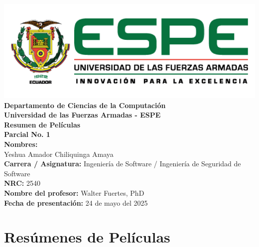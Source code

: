 \documentclass[12pt,a4paper,spanish]{article}
\begin{document}
\begin{titlepage}
    \centering
    \vspace*{1cm}
    \includegraphics[width=0.8\linewidth]{espe.png}\\[0.5cm]
    
    \Large \textbf{Departamento de Ciencias de la Computación}\\
    \large \textbf{Universidad de las Fuerzas Armadas - ESPE}\\[0.5cm]
    
    \Huge \textbf{Resumen de Películas}\\[0.3cm]
    \Large \textbf{Parcial No. 1}\\[0.8cm]
    
    \textbf{Nombres:}\\
    Yeshua Amador Chiliquinga Amaya\\[0.3cm]
    
    \textbf{Carrera / Asignatura:} Ingeniería de Software / Ingeniería de Seguridad de Software\\
    \textbf{NRC:} 2540\\
    \textbf{Nombre del profesor:} Walter Fuertes, PhD\\[0.5cm]
    
    \textbf{Fecha de presentación:} 24 de mayo del 2025\\[1cm]    
    \vfill
\end{titlepage}

\tableofcontents
\thispagestyle{empty} %
\newpage
\setcounter{page}{1} %

\section{Resúmenes de Películas}
\end{document}
